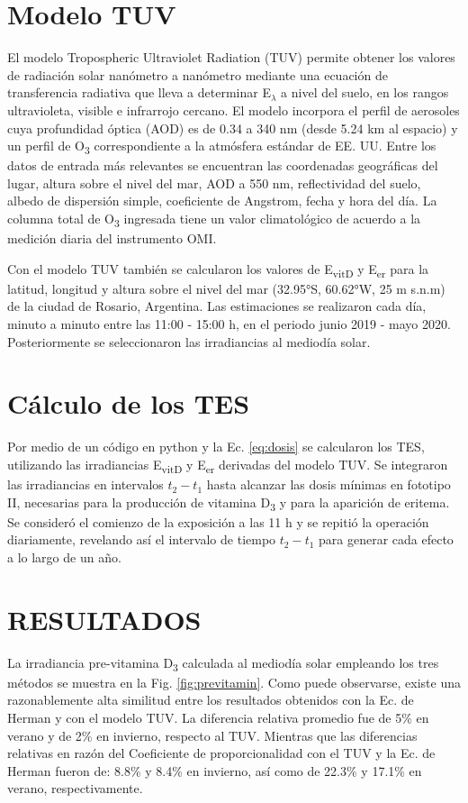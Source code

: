 \documentclass[10pt,twocolumn]{article}
\begin{document}
\section{Modelo TUV}
El modelo Tropospheric Ultraviolet Radiation (TUV) permite obtener los valores de radiación solar nanómetro a nanómetro mediante una ecuación de transferencia radiativa que lleva a determinar E$_\lambda$ a nivel del suelo, en los rangos ultravioleta, visible e infrarrojo cercano. El modelo incorpora el perfil de aerosoles cuya profundidad óptica (AOD) es de 0.34 a 340 nm (desde 5.24 km al espacio) y un perfil de O\textsubscript{3} correspondiente a la atmósfera estándar de EE. UU. Entre los datos de entrada más relevantes se encuentran las coordenadas geográficas del lugar, altura sobre el nivel del mar, AOD a 550 nm, reflectividad del suelo, albedo de dispersión simple, coeficiente de Angstrom, fecha y hora del día. La columna total de O\textsubscript{3} ingresada tiene un valor climatológico de acuerdo a la medición diaria del instrumento OMI.

Con el modelo TUV también se calcularon los valores de E\textsubscript{vitD} y E\textsubscript{er} para la latitud, longitud y altura sobre el nivel del mar (32.95°S, 60.62°W, 25 m s.n.m) de la ciudad de Rosario, Argentina. Las estimaciones se realizaron cada día, minuto a minuto entre las 11:00 - 15:00 h, en el periodo junio 2019 - mayo 2020. Posteriormente se seleccionaron las irradiancias al mediodía solar.

\section{Cálculo de los TES}
Por medio de un código en python y la Ec. \ref{eq:dosis} se calcularon los TES, utilizando las irradiancias E\textsubscript{vitD} y E\textsubscript{er} derivadas del modelo TUV. Se integraron las irradiancias en intervalos $t_2-t_1$ hasta alcanzar las dosis mínimas en fototipo II, necesarias para la producción de vitamina D\textsubscript{3} y para la aparición de eritema. Se consideró el comienzo de la exposición a las 11 h y se repitió la operación diariamente, revelando así el intervalo de tiempo $t_2-t_1$ para generar cada efecto a lo largo de un año.

\section{RESULTADOS}
La irradiancia pre-vitamina D\textsubscript{3} calculada al mediodía solar empleando los tres métodos se muestra en la Fig. \ref{fig:previtamin}. Como puede observarse, existe una razonablemente alta similitud entre los resultados obtenidos con la Ec. de Herman y con el modelo TUV. La diferencia relativa promedio fue de 5\% en verano y de 2\% en invierno, respecto al TUV. Mientras que las diferencias relativas en razón del Coeficiente de proporcionalidad con el TUV y la Ec. de Herman fueron de: 8.8\% y 8.4\% en invierno, así como de 22.3\% y 17.1\% en verano, respectivamente.
\end{document}
